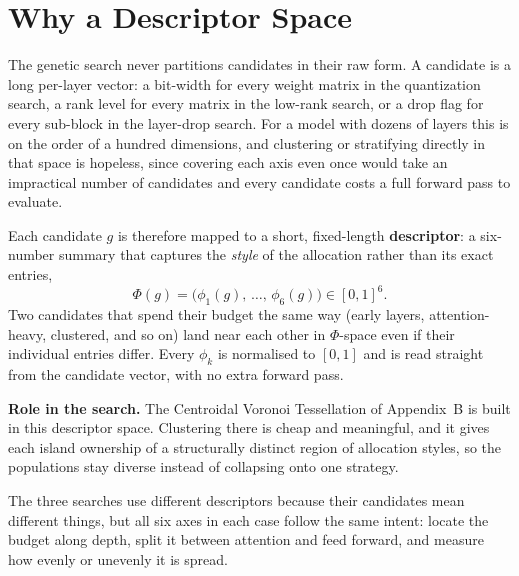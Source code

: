 \documentclass[10pt,twocolumn]{article}
\begin{document}
\appendix
{}

\section{Why a Descriptor Space}
The genetic search never partitions candidates in their raw form. A candidate is a long per-layer vector: a bit-width for every weight matrix in the quantization search, a rank level for every matrix in the low-rank search, or a drop flag for every sub-block in the layer-drop search. For a model with dozens of layers this is on the order of a hundred dimensions, and clustering or stratifying directly in that space is hopeless, since covering each axis even once would take an impractical number of candidates and every candidate costs a full forward pass to evaluate.

Each candidate $g$ is therefore mapped to a short, fixed-length \textbf{descriptor}: a six-number summary that captures the \emph{style} of the allocation rather than its exact entries,
\[
\Phi(g) = \big(\phi_1(g),\,\dots,\,\phi_6(g)\big) \in [0,1]^6 .
\]
Two candidates that spend their budget the same way (early layers, attention-heavy, clustered, and so on) land near each other in $\Phi$-space even if their individual entries differ. Every $\phi_k$ is normalised to $[0,1]$ and is read straight from the candidate vector, with no extra forward pass.

\begin{tcolorbox}[cvtbox]
\textbf{Role in the search.} The Centroidal Voronoi Tessellation of Appendix~B is built in this descriptor space. Clustering there is cheap and meaningful, and it gives each island ownership of a structurally distinct region of allocation styles, so the populations stay diverse instead of collapsing onto one strategy.
\end{tcolorbox}

The three searches use different descriptors because their candidates mean different things, but all six axes in each case follow the same intent: locate the budget along depth, split it between attention and feed forward, and measure how evenly or unevenly it is spread.
\end{document}
